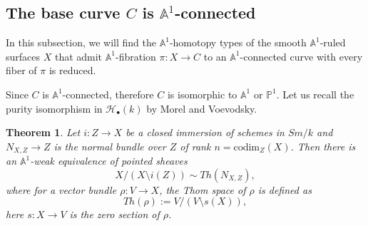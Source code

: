 \documentclass[11pt, reqno]{amsart}
\theoremstyle{plain}
\newtheorem{theorem}[thm]{Theorem}
\theoremstyle{definition}
\newcommand{\sC}{{\mathcal C}}
\newcommand{\A}{{\mathbb A}}
\renewcommand{\P}{{\mathbb P}}
\begin{document}
		\subsection{The base curve $C$ is $\mathbb{A}^1$-connected}

In this subsection, we will find the $\mathbb{A}^1$-homotopy types of the smooth $\mathbb{A}^1$-ruled surfaces $X$ that admit $\mathbb{A}^1$-fibration $\pi: X \to C$ to an $\mathbb{A}^1$-connected curve with  every fiber of $\pi$ is reduced. 





Since $C$ is $\mathbb{A}^1$-connected, therefore $C$ is isomorphic to $\mathbb{A}^1$ or $\P^1$.
Let us recall the purity isomorphism in $\mathcal{H}_\bullet(k)$ by Morel and Voevodsky. 
\begin{theorem} \cite[Theorem 2.23, Section 3.2]{mv} \label{homotopy purity}
	Let $i: Z \to X$ be a closed immersion of schemes in $Sm/k$ and $N_{X,Z} \to Z$ is the normal bundle over $Z$ of rank $n=\text{codim}_Z(X)$. Then there is an $\mathbb{A}^1$-weak equivalence of pointed sheaves
	$$X/(X \setminus i(Z)) \sim Th(N_{X, Z}),$$
	where for a vector bundle $\rho: V \to X$, the Thom space of $\rho$ is defined as
	$$Th(\rho):= V/(V \setminus s(X)),$$
	here $s: X \to V$ is the zero section of $\rho$.
\end{theorem}
\end{document}
